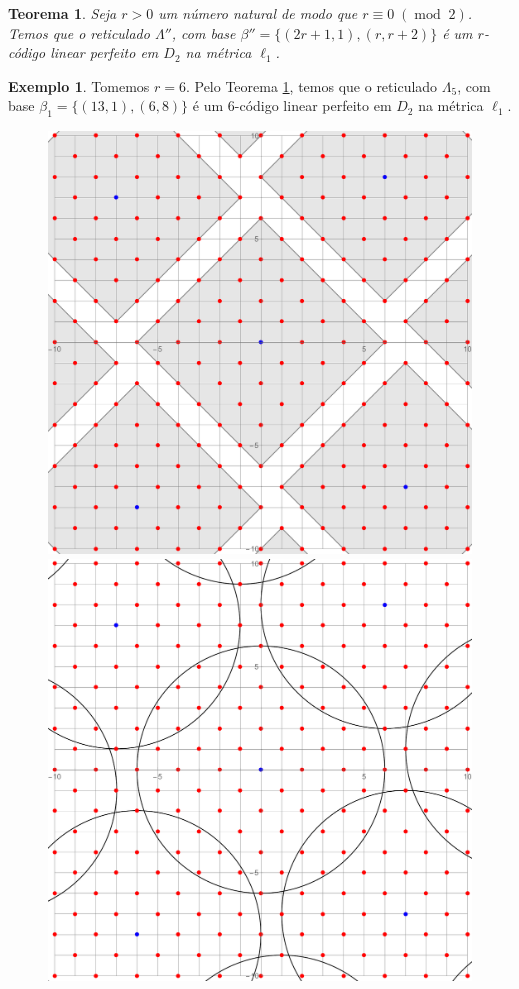 \documentclass{article}
\theoremstyle{plain}
\newtheorem{theorem}{Teorema}
\theoremstyle{definition}
\newtheorem{example}{Exemplo}
\theoremstyle{remark}
\DeclareMathOperator{\modu}{mod}
\begin{document}
  \begin{theorem}\label{cods2}
    Seja $r>0$ um número natural de modo que $r \equiv 0\;(\modu\;2)$. Temos que o reticulado $\Lambda''$, com base $\beta'' = \{(2r+1,1),(r,r+2)\}$ é um $r$-código linear perfeito em $D_2$ na métrica $\ell_1$.
  \end{theorem}

  \begin{example}
    Tomemos $r=6$. Pelo Teorema \ref{cods2}, temos que o reticulado $\Lambda_5$, com base $\beta_1=\{(13,1),(6,8)\}$ é um $6$-código linear perfeito em $D_2$ na métrica $\ell_1$.
    \begin{figure}[ht]
			\centering
        	\includegraphics[scale=0.2]{code2r6l1.pdf}\;\;\;\;\includegraphics[scale=0.2]{code2r6l2.pdf}

\end{figure}
\end{example}
\end{document}
